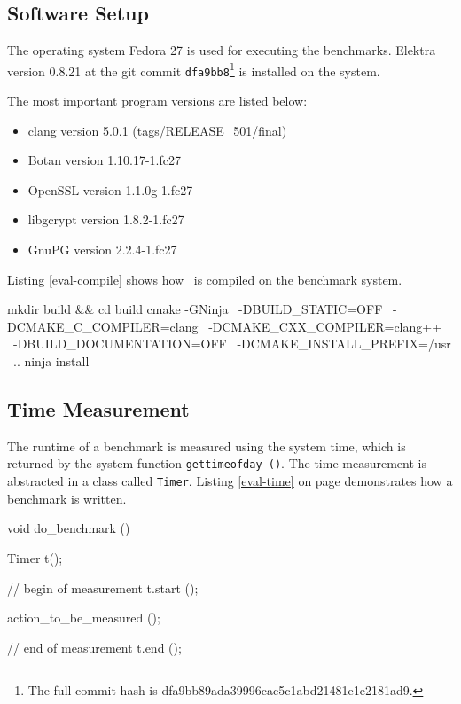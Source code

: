   \subsection{Software Setup}

The operating system Fedora 27 is used for executing the benchmarks.
Elektra version 0.8.21 at the git commit \texttt{dfa9bb8}\footnote{The full commit hash is dfa9bb89ada39996cac5c1abd21481e1e2181ad9.} is installed on the system.

The most important program versions are listed below:

\begin{itemize}
  \item clang version 5.0.1 (tags/RELEASE\_501/final)
  \item Botan version 1.10.17-1.fc27
  \item OpenSSL version 1.1.0g-1.fc27
  \item libgcrypt version 1.8.2-1.fc27
  \item GnuPG version 2.2.4-1.fc27
\end{itemize}

Listing \ref{eval-compile} shows how \elektra ~is compiled on the benchmark system.

\begin{code}[label=eval-compile,language=bash,caption={Elektra compile options for the benchmarks}]
mkdir build && cd build
cmake -GNinja \
    -DBUILD_STATIC=OFF \
    -DCMAKE_C_COMPILER=clang \
    -DCMAKE_CXX_COMPILER=clang++ \
    -DBUILD_DOCUMENTATION=OFF \
    -DCMAKE_INSTALL_PREFIX=/usr \
    ..
ninja install
\end{code}

  \subsection{Time Measurement}

The runtime of a benchmark is measured using the system time, which is returned by the system function \texttt{gettimeofday ()}.
The time measurement is abstracted in a class called \texttt{Timer}.
Listing \ref{eval-time} on page \pageref{eval-time} demonstrates how a benchmark is written.

\begin{code}[label=eval-time,language=C,caption={Time measurement for the benchmarks}]
void do_benchmark ()
{
  Timer t();

  // begin of measurement
  t.start ();

  action_to_be_measured ();

  // end of measurement
  t.end ();
}
\end{code}

